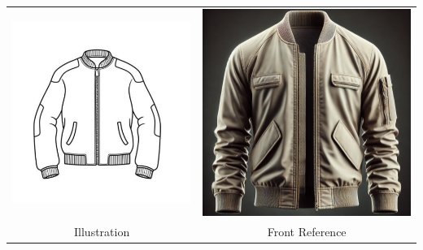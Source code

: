 \documentclass[11pt,a4paper]{article}
\begin{document}
\vspace{0.5cm}
\begin{table}[H]
  \centering
  \begin{tabular}{cc}
    \includegraphics[width=0.48\linewidth]{Screenshot_2025-03-09_at_22.37.32.png} & \includegraphics[width=0.48\linewidth]{DALLE_2025-03-09_22.47.57_-_A_realistic_bomber_jacket_in_a_neutral_color_shown_from_the_front_view._The_jacket_has_a_ribbed_collar_1.5_inches_tall_full-length_zipper_22_inch.webp} \\
    \small Illustration & \small Front Reference \\
  \end{tabular}
\end{table}

\vspace{0.5cm}
\begin{table}[H]
  \centering
\end{table}
\end{document}
